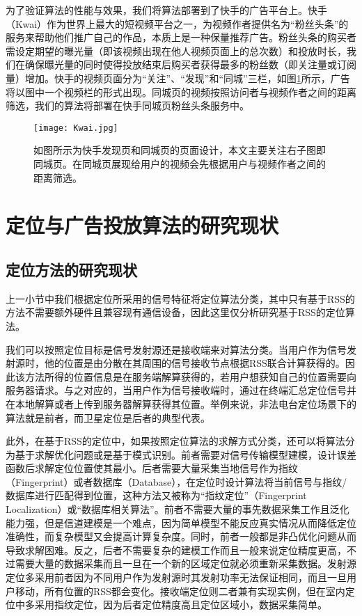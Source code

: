 为了验证算法的性能与效果，我们将算法部署到了快手的广告平台上。快手（Kwai）作为世界上最大的短视频平台之一，为视频作者提供名为“粉丝头条”的服务来帮助他们推广自己的作品，本质上是一种保量推荐广告。粉丝头条的购买者需设定期望的曝光量（即该视频出现在他人视频页面上的总次数）和投放时长，我们在确保曝光量的同时使得投放结束后购买者获得最多的粉丝数（即关注量或订阅量）增加。快手的视频页面分为“关注”、“发现”和“同城”三栏，如图\ref{fig:kwai}所示，广告将以图中一个视频栏的形式出现。同城页的视频按照访问者与视频作者之间的距离筛选，我们的算法将部署在快手同城页粉丝头条服务中。

\begin{figure}[tb]
	\centering
	\texttt{[image: Kwai.jpg]}
	\caption{如图所示为快手发现页和同城页的页面设计，本文主要关注右子图即同城页。在同城页展现给用户的视频会先根据用户与视频作者之间的距离筛选。}
	\label{fig:kwai}
\end{figure}

\section{定位与广告投放算法的研究现状}
\label{sec:first}

\subsection{定位方法的研究现状}

上一小节中我们根据定位所采用的信号特征将定位算法分类，其中只有基于RSS的方法不需要额外硬件且兼容现有通信设备，因此这里仅分析研究基于RSS的定位算法。

我们可以按照定位目标是信号发射源还是接收端来对算法分类。当用户作为信号发射源时，他的位置是由分散在其周围的信号接收节点根据RSS联合计算获得的。因此该方法所得的位置信息是在服务端解算获得的，若用户想获知自己的位置需要向服务器请求。与之对应的，当用户作为信号接收端时，通过在终端汇总定位信号并在本地解算或者上传到服务器解算获得其位置。举例来说，非法电台定位场景下的算法就是前者，而卫星定位是后者的典型代表。

此外，在基于RSS的定位中，如果按照定位算法的求解方式分类，还可以将算法分为基于求解优化问题或是基于模式识别。前者需要对信号传输模型建模，设计误差函数后求解定位位置使其最小。后者需要大量采集当地信号作为指纹（Fingerprint）或者数据库（Database），在定位时设计算法将当前信号与指纹/数据库进行匹配得到位置，这种方法又被称为“指纹定位”（Fingerprint Localization）或“数据库相关算法”。前者不需要大量的事先数据采集工作且泛化能力强，但是信道建模是一个难点，因为简单模型不能反应真实情况从而降低定位准确性，而复杂模型又会提高计算复杂度。同时，前者一般都是非凸优化问题从而导致求解困难。反之，后者不需要复杂的建模工作而且一般来说定位精度更高，不过需要大量的数据采集而且一旦在一个新的区域定位就必须重新采集数据。发射源定位多采用前者因为不同用户作为发射源时其发射功率无法保证相同，而且一旦用户移动，所有位置的RSS都会变化。接收端定位则二者兼有实现实例，但在室内定位中多采用指纹定位，因为后者定位精度高且定位区域小，数据采集简单。


